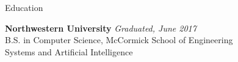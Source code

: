 \documentclass{resume} %
\begin{document}

\begin{rSection}{Education}

{\bf Northwestern University} \hfill {\em Graduated, June 2017} \\ 
B.S. in Computer Science, McCormick School of Engineering \\
Systems and Artificial Intelligence

\end{rSection}

\end{document}

